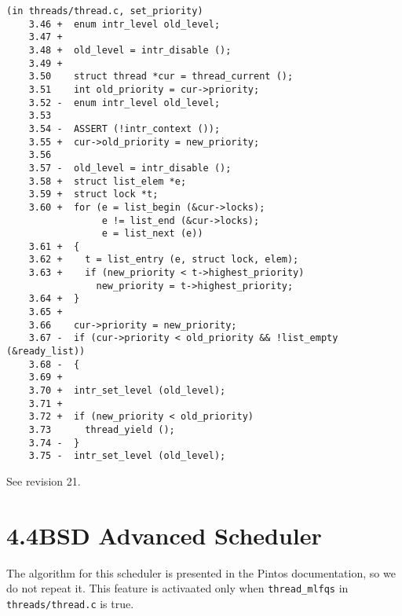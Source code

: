 \documentclass[a4paper,article,11pt,oneside]{article}
\begin{document}
\begin{verbatim}
(in threads/thread.c, set_priority)
    3.46 +  enum intr_level old_level;
    3.47 +
    3.48 +  old_level = intr_disable ();
    3.49 +
    3.50    struct thread *cur = thread_current ();
    3.51    int old_priority = cur->priority;
    3.52 -  enum intr_level old_level;
    3.53  
    3.54 -  ASSERT (!intr_context ());
    3.55 +  cur->old_priority = new_priority;
    3.56  
    3.57 -  old_level = intr_disable ();
    3.58 +  struct list_elem *e;
    3.59 +  struct lock *t;
    3.60 +  for (e = list_begin (&cur->locks);
                 e != list_end (&cur->locks);
                 e = list_next (e))
    3.61 +  {
    3.62 +    t = list_entry (e, struct lock, elem);
    3.63 +    if (new_priority < t->highest_priority)
                new_priority = t->highest_priority;
    3.64 +  }
    3.65 +
    3.66    cur->priority = new_priority;
    3.67 -  if (cur->priority < old_priority && !list_empty (&ready_list))
    3.68 -  {
    3.69 +
    3.70 +  intr_set_level (old_level);
    3.71 +
    3.72 +  if (new_priority < old_priority)
    3.73      thread_yield ();
    3.74 -  }
    3.75 -  intr_set_level (old_level);
\end{verbatim}

See revision 21.

\section{4.4BSD Advanced Scheduler}\label{secadv}
The algorithm for this scheduler is presented in the Pintos
documentation, so we do not repeat it. This feature is activaated only
when \texttt{thread\_mlfqs} in \texttt{threads/thread.c} is true.
\end{document}
